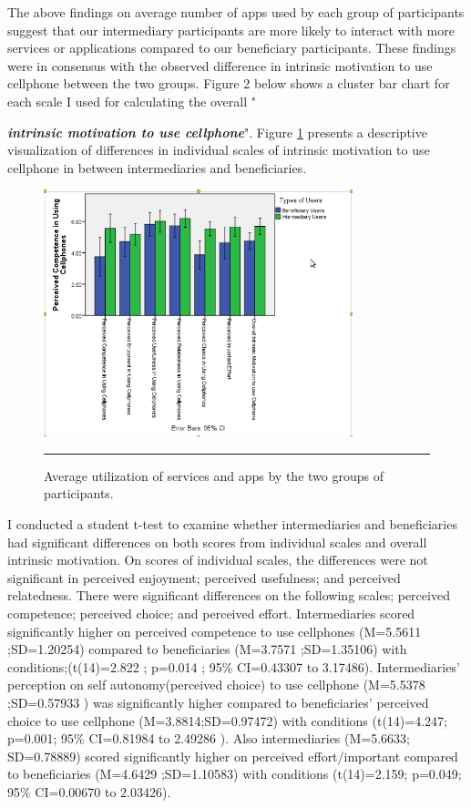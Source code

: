 The above findings on average number of apps used by each group of participants suggest that our intermediary participants are more likely to interact with more services or applications compared to our beneficiary participants. These findings were in consensus with the observed difference in intrinsic motivation to use cellphone between the two groups. Figure 2 below shows a cluster bar chart for each scale I used for calculating the overall "{\textbf{\emph{intrinsic motivation to use cellphone}}". Figure \ref {figure:IMIScales} presents a descriptive visualization of differences in individual scales of intrinsic motivation to use cellphone in between intermediaries and beneficiaries.    
\begin{figure}[htbp]
  \centering
    \includegraphics[width=0.8\textwidth]{Figures/IMIScales.png}
    \rule{35em}{0.5pt}
  \caption{Average utilization of services and apps by the two groups of participants.}
  \label{figure:IMIScales}
\end{figure}  
I conducted a student t-test to examine whether intermediaries and beneficiaries had significant differences on both scores from individual scales and overall intrinsic motivation. On scores of individual scales,  the differences were not significant in perceived enjoyment; perceived usefulness; and perceived relatedness. There were significant differences on the following scales; perceived competence; perceived choice; and perceived effort. Intermediaries scored significantly higher on perceived competence to use cellphones (M=5.5611 ;SD=1.20254) compared to beneficiaries (M=3.7571 ;SD=1.35106) with conditions;(t(14)=2.822 ; p=0.014 ; 95\% CI=0.43307 to 3.17486). Intermediaries' perception on self autonomy(perceived choice) to use cellphone (M=5.5378 ;SD=0.57933 ) was significantly higher compared to beneficiaries' perceived choice to use cellphone (M=3.8814;SD=0.97472) with conditions (t(14)=4.247; p=0.001; 95\% CI=0.81984  to 2.49286 ). Also intermediaries (M=5.6633; SD=0.78889) scored significantly higher on perceived effort/important compared to beneficiaries (M=4.6429 ;SD=1.10583) with conditions (t(14)=2.159; p=0.049; 95\% CI=0.00670 to 2.03426).\newline
}
